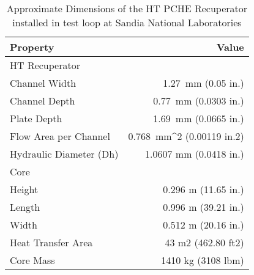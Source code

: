 \begin{table}
\label{tab:Approximate}
\caption{Approximate Dimensions of the HT PCHE Recuperator installed in test loop at Sandia National Laboratories \cite{Pasch2012}}
\begin{center}
\begin{tabulary}{0.9\textwidth}{LR}
\toprule
Property 	&	Value	\\
\midrule
HT Recuperator	&		\\
Channel Width 	&	1.27~mm (0.05 in.)	\\
Channel Depth 	&	0.77~mm (0.0303 in.)	\\
Plate Depth	&	 1.69~mm (0.0665 in.)	\\
Flow Area per Channel 	&	0.768~mm^2 (0.00119 in.2)	\\
Hydraulic Diameter (Dh) 	&	1.0607 mm (0.0418 in.)	\\
Core	&		\\
Height 	&	0.296 m (11.65 in.)	\\
Length 	&	0.996 m (39.21 in.)	\\
Width 	&	0.512 m (20.16 in.)	\\
Heat Transfer Area 	&	43 m2 (462.80 ft2)	\\
Core Mass	&	 1410 kg (3108 lbm)	\\

\bottomrule
\end{tabulary}
\end{center}
\end{table}